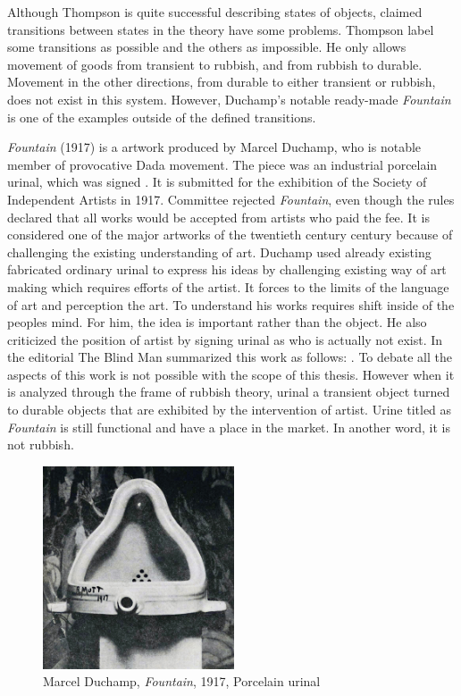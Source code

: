 Although Thompson is quite successful describing states of objects, claimed transitions between states in the theory have some problems. Thompson label some transitions as possible and the others as impossible. He only allows movement of goods from transient to rubbish, and from rubbish to durable. Movement in the other directions, from durable to either transient or rubbish, does not exist in this system. However, Duchamp’s notable ready-made \textit{Fountain} is one of the examples outside of the defined transitions.

\textit{Fountain} (1917) is a artwork produced by Marcel Duchamp, who is notable member of provocative Dada movement. The piece was an industrial porcelain urinal, which was signed . It is submitted for the exhibition of the Society of Independent Artists in 1917. Committee rejected \textit{Fountain}, even though the rules declared that all works would be accepted from artists who paid the fee. It is considered one of the major artworks of the twentieth century century because of challenging the existing understanding of art. Duchamp used already existing fabricated ordinary urinal to express his ideas by challenging existing way of art making which requires efforts of the artist. It forces to the limits of the language of art and perception the art. To understand his works requires shift inside of the peoples mind. For him, the idea is important rather than the object. He also criticized the position of artist by signing urinal as  who is actually not exist. In the editorial The Blind Man summarized this work as follows:  \citep{duchamp1917mutt}. To debate all the aspects of this work is not possible with the scope of this thesis. However when it is analyzed through the frame of rubbish theory, urinal a transient object turned to durable objects that are exhibited by the intervention of artist. Urine titled as \textit{Fountain} is still functional and have a place in the market. In another word, it is not rubbish.

\begin{figure}[h!]
  \centering
  \includegraphics[height=6cm]{graphics/Duchamp_Fountaine.jpg}
  \caption{Marcel Duchamp, \textit{Fountain}, 1917, Porcelain urinal}
  \label{fig:Duchamp_Fountaine}
\end{figure}



